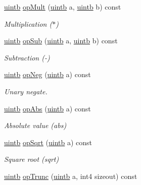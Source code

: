 \begin{DoxyCompactItemize}
\mbox{\hyperlink{types_8h_a2db313c5d32a12b01d26ac9b3bca178f}{uintb}} \mbox{\hyperlink{class_float_format_a289c2216fe9add39e225991fc7baad3c}{op\+Mult}} (\mbox{\hyperlink{types_8h_a2db313c5d32a12b01d26ac9b3bca178f}{uintb}} a, \mbox{\hyperlink{types_8h_a2db313c5d32a12b01d26ac9b3bca178f}{uintb}} b) const
\begin{DoxyCompactList}\small\item\em Multiplication ($\ast$) \end{DoxyCompactList}\item 
\mbox{\hyperlink{types_8h_a2db313c5d32a12b01d26ac9b3bca178f}{uintb}} \mbox{\hyperlink{class_float_format_affc23eaa38dae2db40e8e16c9cf9c821}{op\+Sub}} (\mbox{\hyperlink{types_8h_a2db313c5d32a12b01d26ac9b3bca178f}{uintb}} a, \mbox{\hyperlink{types_8h_a2db313c5d32a12b01d26ac9b3bca178f}{uintb}} b) const
\begin{DoxyCompactList}\small\item\em Subtraction (-\/) \end{DoxyCompactList}\item 
\mbox{\hyperlink{types_8h_a2db313c5d32a12b01d26ac9b3bca178f}{uintb}} \mbox{\hyperlink{class_float_format_af639368d2760482533e8ebf5ee18995b}{op\+Neg}} (\mbox{\hyperlink{types_8h_a2db313c5d32a12b01d26ac9b3bca178f}{uintb}} a) const
\begin{DoxyCompactList}\small\item\em Unary negate. \end{DoxyCompactList}\item 
\mbox{\hyperlink{types_8h_a2db313c5d32a12b01d26ac9b3bca178f}{uintb}} \mbox{\hyperlink{class_float_format_a5edfc9c055efded2f22bb42a91058164}{op\+Abs}} (\mbox{\hyperlink{types_8h_a2db313c5d32a12b01d26ac9b3bca178f}{uintb}} a) const
\begin{DoxyCompactList}\small\item\em Absolute value (abs) \end{DoxyCompactList}\item 
\mbox{\hyperlink{types_8h_a2db313c5d32a12b01d26ac9b3bca178f}{uintb}} \mbox{\hyperlink{class_float_format_a13cc7817eee998adc9699333cb8f144d}{op\+Sqrt}} (\mbox{\hyperlink{types_8h_a2db313c5d32a12b01d26ac9b3bca178f}{uintb}} a) const
\begin{DoxyCompactList}\small\item\em Square root (sqrt) \end{DoxyCompactList}\item 
\mbox{\hyperlink{types_8h_a2db313c5d32a12b01d26ac9b3bca178f}{uintb}} \mbox{\hyperlink{class_float_format_a97577950c7ef0b53099d17deee29f198}{op\+Trunc}} (\mbox{\hyperlink{types_8h_a2db313c5d32a12b01d26ac9b3bca178f}{uintb}} a, int4 sizeout) const

\end{DoxyCompactItemize}
